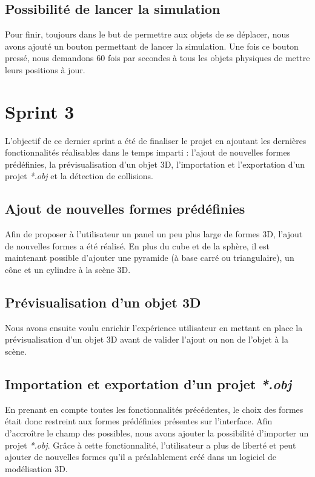 \documentclass[11pt]{report}
\begin{document}
\subsection{Possibilité de lancer la simulation}

Pour finir, toujours dans le but de permettre aux objets de se déplacer, nous avons ajouté un bouton permettant de lancer la simulation.
Une fois ce bouton pressé, nous demandons 60 fois par secondes à tous les objets physiques de mettre leurs positions à jour.


\section{Sprint 3}

L'objectif de ce dernier sprint a été de finaliser le projet en ajoutant les dernières fonctionnalités réalisables dans le temps imparti : l'ajout de nouvelles formes prédéfinies, la prévisualisation d'un objet 3D, l'importation et l'exportation d'un projet \textit{*.obj} et la détection de collisions. 

\subsection{Ajout de nouvelles formes prédéfinies}
Afin de proposer à l'utilisateur un panel un peu plus large de formes 3D, l'ajout de nouvelles formes a été réalisé.
En plus du cube et de la sphère, il est maintenant possible d'ajouter une pyramide (à base carré ou triangulaire), un cône et un cylindre à la scène 3D.


\subsection{Prévisualisation d'un objet 3D}
Nous avons ensuite voulu enrichir l'expérience utilisateur en mettant en place la prévisualisation d'un objet 3D avant de valider l'ajout ou non de l'objet à la scène.


\subsection{Importation et exportation d'un projet \textit{*.obj}}
En prenant en compte toutes les fonctionnalités précédentes, le choix des formes était donc restreint aux formes prédéfinies présentes sur l'interface. Afin d'accroître le champ des possibles, nous avons ajouter la possibilité d'importer un projet \textit{*.obj}. Grâce à cette fonctionnalité, l'utilisateur a plus de liberté et peut ajouter de nouvelles formes qu'il a préalablement créé dans un logiciel de modélisation 3D.\newline
\end{document}
